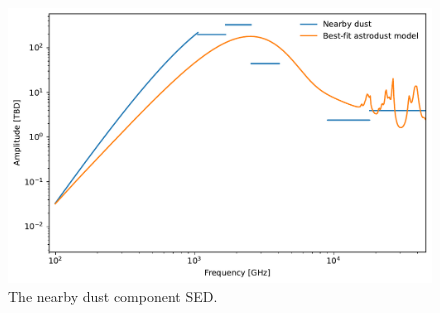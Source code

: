 \documentclass{aa}
\begin{document}
\begin{figure}
  \centering
  \includegraphics[width=\columnwidth]{figures/nearby_dust_sed.pdf}
  \caption{The nearby dust component SED.}
  \label{fig:nearby_dust_sed}
\end{figure}
\end{document}
